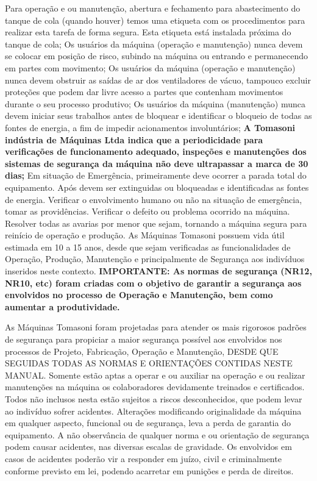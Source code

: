 Para operação e ou manutenção, abertura e fechamento para abastecimento do tanque de cola (quando houver) temos
uma etiqueta com os procedimentos para realizar esta tarefa de forma segura. Esta etiqueta está instalada próxima do
tanque de cola;
Os usuários da máquina (operação e manutenção) nunca devem se colocar em posição de risco, subindo na máquina ou
entrando e permanecendo em partes com movimento;
Os usuários da máquina (operação e manutenção) nunca devem obstruir as saídas de ar dos ventiladores de vácuo,
tampouco excluir proteções que podem dar livre acesso a partes que contenham movimentos durante o seu processo
produtivo;
Os usuários da máquina (manutenção) munca devem iniciar seus trabalhos antes de bloquear e identificar o bloqueio de
todas as fontes de energia, a fim de impedir acionamentos involuntários;
\textbf{A Tomasoni indústria de Máquinas Ltda indica que a periodicidade para verificações de funcionamento adequado,
inspeções e manutenções dos sistemas de segurança da máquina não deve ultrapassar a marca de 30 dias;}
Em situação de Emergência, primeiramente deve ocorrer a parada total do equipamento. Após devem ser extinguidas ou
bloqueadas e identificadas as fontes de energia. Verificar o envolvimento humano ou não na situação de emergência,
tomar as providências. Verificar o defeito ou problema ocorrido na máquina. Resolver todas as avarias por menor que
sejam, tornando a máquina segura para reinício de operação e produção.
As Máquinas Tomasoni possuem vida útil estimada em 10 a 15 anos, desde que sejam verificadas as funcionalidades de
Operação, Produção, Manutenção e principalmente de Segurança aos indivíduos inseridos neste contexto.
\textbf{IMPORTANTE: As normas de segurança (NR12, NR10, etc) foram criadas com o objetivo de garantir a segurança aos
envolvidos no processo de Operação e Manutenção, bem como aumentar a produtividade.
}


\newpage
\thispagestyle{fancy}
\vspace*{50 pt}

As Máquinas Tomasoni foram projetadas para atender os mais rigorosos padrões de segurança para propiciar a maior segurança possível 
aos envolvidos nos processos de Projeto, Fabricação, Operação e Manutenção, DESDE QUE SEGUIDAS TODAS AS NORMAS E ORIENTAÇÕES CONTIDAS NESTE MANUAL.
Somente estão aptas a operar e ou auxiliar na operação e ou realizar
manutenções na máquina os colaboradores devidamente treinados e certificados.
Todos não inclusos nesta estão sujeitos a riscos desconhecidos, que podem
levar ao indivíduo sofrer acidentes.
Alterações modificando originalidade da máquina em qualquer aspecto, funcional
ou de segurança, leva a perda de garantia do equipamento.
A não observância de qualquer norma e ou orientação de segurança podem causar
acidentes, nas diversas escalas de gravidade. Os envolvidos em casos de
acidentes poderão vir a responder em juízo, civil e criminalmente conforme
previsto em lei, podendo acarretar em punições e perda de direitos.

